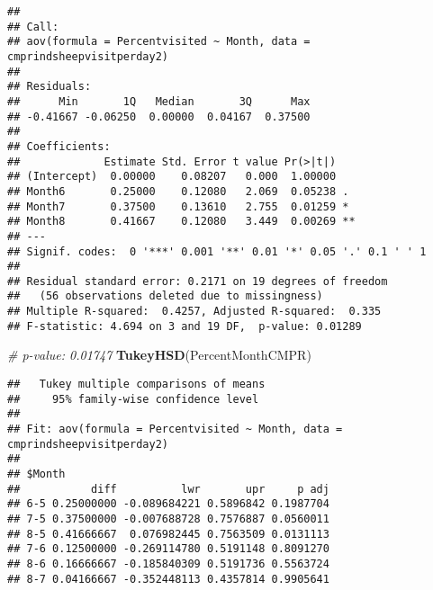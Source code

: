 \documentclass[]{article}
\newenvironment{Shaded}{\begin{snugshade}}{\end{snugshade}}
\newcommand{\CommentTok}[1]{\textcolor[rgb]{0.56,0.35,0.01}{\textit{#1}}}
\newcommand{\KeywordTok}[1]{\textcolor[rgb]{0.13,0.29,0.53}{\textbf{#1}}}
\newcommand{\NormalTok}[1]{#1}
\begin{document}
\begin{verbatim}
## 
## Call:
## aov(formula = Percentvisited ~ Month, data = cmprindsheepvisitperday2)
## 
## Residuals:
##      Min       1Q   Median       3Q      Max 
## -0.41667 -0.06250  0.00000  0.04167  0.37500 
## 
## Coefficients:
##             Estimate Std. Error t value Pr(>|t|)   
## (Intercept)  0.00000    0.08207   0.000  1.00000   
## Month6       0.25000    0.12080   2.069  0.05238 . 
## Month7       0.37500    0.13610   2.755  0.01259 * 
## Month8       0.41667    0.12080   3.449  0.00269 **
## ---
## Signif. codes:  0 '***' 0.001 '**' 0.01 '*' 0.05 '.' 0.1 ' ' 1
## 
## Residual standard error: 0.2171 on 19 degrees of freedom
##   (56 observations deleted due to missingness)
## Multiple R-squared:  0.4257, Adjusted R-squared:  0.335 
## F-statistic: 4.694 on 3 and 19 DF,  p-value: 0.01289
\end{verbatim}

\begin{Shaded}
\begin{Highlighting}[]
\CommentTok{# p-value: 0.01747}
\KeywordTok{TukeyHSD}\NormalTok{(PercentMonthCMPR)}
\end{Highlighting}
\end{Shaded}

\begin{verbatim}
##   Tukey multiple comparisons of means
##     95% family-wise confidence level
## 
## Fit: aov(formula = Percentvisited ~ Month, data = cmprindsheepvisitperday2)
## 
## $Month
##           diff          lwr       upr     p adj
## 6-5 0.25000000 -0.089684221 0.5896842 0.1987704
## 7-5 0.37500000 -0.007688728 0.7576887 0.0560011
## 8-5 0.41666667  0.076982445 0.7563509 0.0131113
## 7-6 0.12500000 -0.269114780 0.5191148 0.8091270
## 8-6 0.16666667 -0.185840309 0.5191736 0.5563724
## 8-7 0.04166667 -0.352448113 0.4357814 0.9905641
\end{verbatim}
\end{document}
